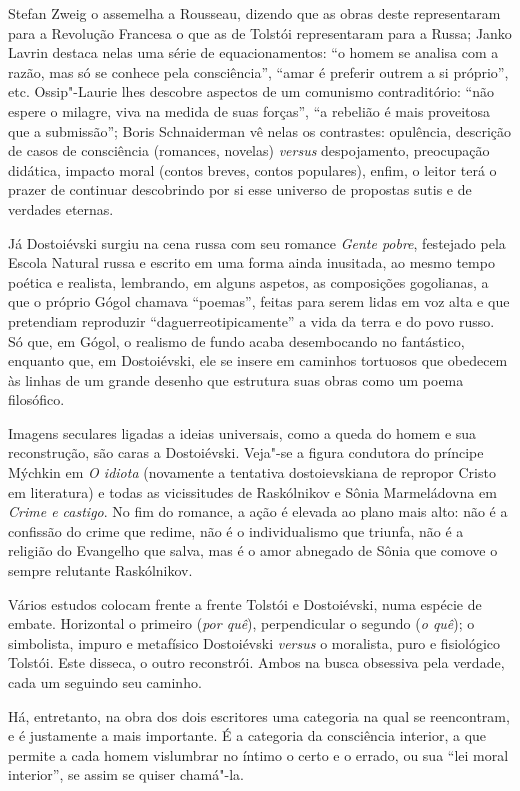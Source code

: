 Stefan Zweig o assemelha a Rousseau, dizendo que as obras deste representaram para a Revolução Francesa o que as de Tolstói representaram para a Russa; Janko Lavrin destaca nelas uma série de equacionamentos: ``o homem se analisa com a razão, mas só se conhece pela consciência'', ``amar é preferir outrem a si próprio'', etc. Ossip"-Laurie lhes descobre aspectos de um comunismo contraditório: ``não espere o milagre, viva na medida de suas forças'', ``a rebelião é mais proveitosa que a submissão''; Boris Schnaiderman vê nelas os contrastes: opulência, descrição de casos de consciência (romances, novelas) \emph{versus} despojamento, preocupação didática, impacto moral (contos breves, contos populares), enfim, o leitor terá o prazer de continuar descobrindo por si esse universo de propostas sutis e de verdades eternas.

Já Dostoiévski surgiu na cena russa com seu romance \emph{Gente pobre}, festejado pela Escola Natural russa e escrito em uma forma ainda inusitada, ao mesmo tempo poética e realista, lembrando, em alguns aspetos, as composições gogolianas, a que o próprio Gógol chamava ``poemas'', feitas para serem lidas em voz alta e que pretendiam reproduzir ``daguerreotipicamente'' a vida da terra e do povo russo. Só que, em Gógol, o realismo de fundo acaba desembocando no fantástico, enquanto que, em Dostoiévski, ele se insere em caminhos tortuosos que obedecem às linhas de um grande desenho que estrutura suas obras como um poema filosófico.

Imagens seculares ligadas a ideias universais, como a queda do homem e sua reconstrução, são caras a Dostoiévski. Veja"-se a figura condutora do príncipe Mýchkin em \emph{O idiota} (novamente a tentativa dostoievskiana de repropor Cristo em literatura) e todas as vicissitudes de Raskólnikov e Sônia Marmeládovna em \emph{Crime e castigo}. No fim do romance, a ação é elevada ao plano mais alto: não é a confissão do crime que redime, não é o individualismo que triunfa, não é a religião do Evangelho que salva, mas é o amor abnegado de Sônia que comove o sempre relutante Raskólnikov.

Vários estudos colocam frente a frente Tolstói e
Dostoiévski, numa espécie de embate. Horizontal o primeiro (\emph{por quê}),
perpendicular o segundo (\emph{o quê}); o simbolista, impuro e metafísico
Dostoiévski \emph{versus} o moralista, puro e fisiológico Tolstói. Este disseca, o outro reconstrói. Ambos
na busca obsessiva pela verdade, cada um seguindo
seu caminho.

Há, entretanto, na obra dos dois escritores
uma categoria na qual se reencontram, e é justamente a mais importante. É a
categoria da consciência interior, a que permite a cada homem vislumbrar
no íntimo o certo e o errado, ou sua ``lei moral interior'', se assim
se quiser chamá"-la.


